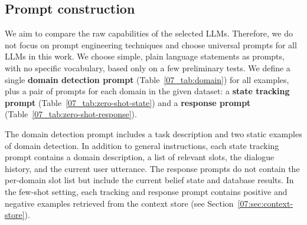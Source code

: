 \subsection{Prompt construction}
\label{07:sec:prompts}
We aim to compare the raw capabilities of the selected LLMs.
Therefore, we do not focus on prompt engineering techniques and choose universal prompts for all LLMs in this work.
We choose simple, plain language statements as prompts, with no specific vocabulary, based only on a few preliminary tests.
We define a single \textbf{domain detection prompt} (Table~\ref{07_tab:domain}) for all examples, plus a pair of prompts for each domain in the given dataset: a \textbf{state tracking prompt} (Table~\ref{07_tab:zero-shot-state}) and a \textbf{response prompt} (Table~\ref{07_tab:zero-shot-response}).

The domain detection prompt includes a task description and two static examples of domain detection.
In addition to general instructions, each state tracking prompt contains a domain description, a list of relevant slots, the dialogue history, and the current user utterance.
The response prompts do not contain the per-domain slot list but include the current belief state and database results.
In the few-shot setting, each tracking and response prompt contains positive and negative examples retrieved from the context store (see Section~\ref{07:sec:context-store}).

